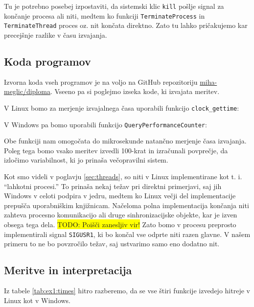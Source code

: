 \documentclass[a4paper,12pt,openright]{book}
\begin{document}
Tu je potrebno posebej izpostaviti, da sistemski klic \texttt{kill} pošlje signal za končanje procesa ali niti, medtem ko funkciji \texttt{TerminateProcess} in \texttt{TerminateThread} proces oz. nit končata direktno.
Zato tu lahko pričakujemo kar precejšnje razlike v času izvajanja.

\subsection{Koda programov}

Izvorna koda vseh programov je na voljo na GitHub repozitoriju \href{https://github.com/miha-meglic/diploma/tree/master/code}{miha-meglic/diploma}.
Vseeno pa si poglejmo izseka kode, ki izvajata meritev.

V Linux bomo za merjenje izvajalnega časa uporabili funkcijo \texttt{clock\_gettime}:


V Windows pa bomo uporabili funkcijo \texttt{QueryPerformanceCounter}:


Obe funkciji nam omogočata do mikrosekunde natančno merjenje časa izvajanja.
Poleg tega bomo vsako meritev izvedli 100-krat in izračunali povprečje, da izločimo variabilnost, ki jo prinaša večopravilni sistem.

Kot smo videli v poglavju \ref{sec:threads}, so niti v Linux implementirane kot t. i. ``lahkotni procesi.''
To prinaša nekaj težav pri direktni primerjavi, saj jih Windows v celoti podpira v jedru, medtem ko Linux večji del implementacije prepušča uporabniškim knjižnicam.
Načeloma polna implementacija končanja niti zahteva procesno komunikacijo ali druge sinhronizacijske objekte, kar je izven obsega tega dela.
\colorbox{yellow}{TODO: Poišči zanesljiv vir!}
Zato bomo v procesu preprosto implementirali signal \texttt{SIGUSR1}, ki bo končal vse odprte niti razen glavne.
V našem primeru to ne bo povzročilo težav, saj ustvarimo samo eno dodatno nit.

\subsection{Meritve in interpretacija}

Iz tabele \ref{tab:ex1:times} hitro razberemo, da se vse štiri funkcije izvedejo hitreje v Linux kot v Windows.
\end{document}
